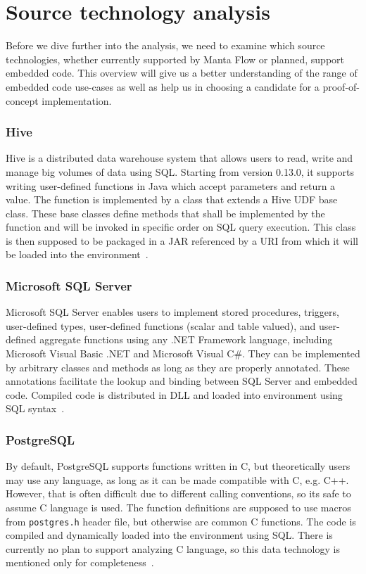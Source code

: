 \section{Source technology analysis}

Before we dive further into the analysis, we need to examine which source technologies, whether currently supported by Manta Flow or planned, support embedded code. This overview will give us a better understanding of the range of embedded code use-cases as well as help us in choosing a candidate for a proof-of-concept implementation.

\subsubsection{Hive}
Hive is a distributed data warehouse system that allows users to read, write and manage big volumes of data using SQL. Starting from version 0.13.0, it supports writing user-defined functions in Java which accept parameters and return a value. The function is implemented by a class that extends a Hive UDF base class. These base classes define methods that shall be implemented by the function and will be invoked in specific order on SQL query execution. This class is then supposed to be packaged in a JAR referenced by a URI from which it will be loaded into the environment~\cite{hive}.

\subsubsection{Microsoft SQL Server}
Microsoft SQL Server enables users to implement stored procedures, triggers, user-defined types, user-defined functions (scalar and table valued), and user-defined aggregate functions using any .NET Framework language, including Microsoft Visual Basic .NET and Microsoft Visual C\#. They can be implemented by arbitrary classes and methods as long as they are properly annotated. These annotations facilitate the lookup and binding between SQL Server and embedded code. Compiled code is distributed in DLL and loaded into environment using SQL syntax~\cite{mssql}.

\subsubsection{PostgreSQL}
By default, PostgreSQL supports functions written in C, but theoretically users may use any language, as long as it can be made compatible with C, e.g. C++. However, that is often difficult due to different calling conventions, so its safe to assume C language is used. The function definitions are supposed to use macros from \texttt{postgres.h} header file, but otherwise are common C functions. The code is compiled and dynamically loaded into the environment using SQL. There is currently no plan to support analyzing C language, so this data technology is mentioned only for completeness~\cite{postgresql}.

